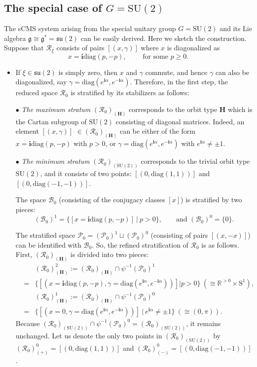 \documentclass[12pt]{amsart}
\theoremstyle{definition}
\numberwithin{equation}{section}
\def\diag{\mathrm{diag}}
\newcommand{\Sone}{\mathrm{S}^1}
\newcommand{\imagunit}{\mathbf{i}}
\newcommand{\SU}{\mathrm{SU}}
\newcommand{\su}{\mathfrak{su}}
\newcommand{\Reducedxi}{\mathcal{R}_\xi}
\newcommand{\SET}[1]{\{#1\}}
\newcommand{\Cartan}{\mathbf{H}}
\newcommand{\Rxizero}{\mathcal{R}_{0}}
\newcommand{\Pxizero}{\mathcal{P}_{0}}
\newcommand{\Bxizero}{\mathcal{B}_{0}}
\begin{document}
\subsection{The special case of $G=\SU(2)$}\label{Sec:SU(2)} The sCMS system  arising from the special unitary group  \( G = \SU(2) \) and its Lie algebra \( \mathfrak{g} \cong \mathfrak{g}^* = \su(2) \) can be easily derived.  Here we sketch the construction. Suppose that $\Reducedxi$  consists of pairs $[(x,\gamma)]$ where $x$ is diagonalized as $$x=\imagunit \diag(p,-p),\qquad \mbox{ for some }p\geqslant 0.$$
\begin{itemize}
  \item[\textbf{(I)}]       
If $\xi\in \su(2)$ is simply zero, then $x$ and $\gamma$ commute, and hence $\gamma$ can   also be diagonalized, say $\gamma=\diag(e^{\imagunit \alpha},e^{-\imagunit \alpha})$. Therefore, in the first step,
  the reduced space $\Rxizero$ is stratified by its stabilizers as follows:  
         
         
         $\bullet$ \textit{The maximum stratum}  $(\Rxizero)_{(\Cartan)}$ corresponds to the orbit type $\Cartan$  which is the Cartan subgroup of $\SU(2)$ consisting of diagonal matrices. Indeed, an element $[(x,\gamma)]$ $\in (\Rxizero)_{(\Cartan)}$ can be either of the form $x=\imagunit \diag(p,-p)$ with   $p> 0$, or $\gamma=\diag(e^{\imagunit \alpha},e^{-\imagunit \alpha})$   with $e^{\imagunit \alpha} \neq \pm 1$.
     
     $\bullet$ \textit{The minimum stratum} $(\Rxizero)_{(\SU(2))}$ corresponds to the trivial orbit type $\SU(2)$, and it consists of two points: $[(0,\diag(1,1))]$ and $[(0,\diag(-1,-1))]$.
   
   The space  $\Bxizero$ (consisting of the conjugacy classes $[x]$)  is stratified by two pieces: 
   $$(\Bxizero)^1=\SET{[x= \imagunit \diag(p,-p)]~|~ p> 0},\qquad \mbox{and } (\Bxizero)^0=\SET{0}.$$
  
  The stratified space $\Pxizero=(\Pxizero)^1\sqcup (\Pxizero)^0  $ (consisting of pairs $[(x,-x)]$) can be identified with $\Bxizero$. So, the refined stratification of $\Rxizero$ is as follows. First, $(\Rxizero)_{(\Cartan)}$ is divided into two pieces:
\begin{eqnarray*}  && (\Rxizero)^2_{(\Cartan)  }:=(\Rxizero) _{(\Cartan)}\cap \psi^{-1}(\Pxizero)^1 \\
&=&\SET{[(x=\imagunit \diag(p,-p),\gamma=\diag(e^{\imagunit \alpha},e^{-\imagunit \alpha}))]|p>0}~(\cong \mathbb{R}^{>0}\times \Sone),\\
&& (\Rxizero)^1_{(\Cartan)} := (\Rxizero) _{(\Cartan)}\cap \psi^{-1}(\Pxizero)^0   
\\&=&\SET{[(x=0,\gamma=\diag(e^{\imagunit \alpha},e^{-\imagunit \alpha}))]~|~e^{\imagunit \alpha} \neq \pm 1  }~(\cong (0,\pi)).
\end{eqnarray*}  
Because   $(\Rxizero)_{(\SU(2))}\cap \psi^{-1}(\Pxizero)^0=(\Rxizero)_{(\SU(2))}$, it remains unchanged. Let us denote the only two points in $(\Rxizero)_{(\SU(2))}$ by $(\Rxizero)^0_{(+)}=[(0,\diag(1,1))]$ and $(\Rxizero)^0_{(-)} =[(0,\diag(-1,-1))]$.


\end{itemize}
\end{document}

